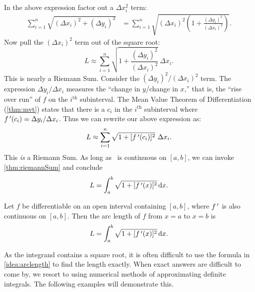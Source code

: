 In the above expression factor out a $\Delta x_i^2$ term:
\begin{align*}
	\sum_{i=1}^n \sqrt{(\Delta x_i)^2 + (\Delta y_i)^2}
	&= \sum_{i=1}^n \sqrt{(\Delta x_i)^2\left(1 + \frac{(\Delta y_i)^2}{(\Delta x_i)^2}\right)}.
\end{align*}
Now pull the $(\Delta x_i)^2$ term out of the square root:
\[L\approx\sum_{i=1}^n\sqrt{1 + \frac{(\Delta y_i)^2}{(\Delta x_i)^2}}\ \Delta x_i.\]
This is nearly a Riemann Sum. Consider the $(\Delta y_i)^2/(\Delta x_i)^2$ term. The expression $\Delta y_i/\Delta x_i$ measures the ``change in $y$/change in $x$,'' that is, the ``rise over run'' of $f$ on the $i^{\text{th}}$ subinterval. The Mean Value Theorem of Differentiation (\autoref{thm:mvt}) states that there is a $c_i$ in the $i^{\text{th}}$ subinterval where $f\,'(c_i) = \Delta y_i/\Delta x_i$. Thus we can rewrite our above expression as:
\[L\approx\sum_{i=1}^n\sqrt{1+[\fp(c_i)]^2}\ \Delta x_i.\]
This \emph{is} a Riemann Sum. As long as \fp\ is continuous on $[a,b]$, we can invoke \autoref{thm:riemannSum} and conclude
\[L=\int_a^b\sqrt{1+[f\,'(x)]^2}\operatorname{d}\! x.\]

\begin{keyidea}\label{idea:arclength}%
Let $f$ be differentiable on an open interval containing $[a,b]$, where $f\,'$ is also continuous on $[a,b]$. Then the arc length of $f$ from $x=a$ to $x=b$ is
\[L = \int_a^b \sqrt{1+[f\,'(x)]^2}\operatorname{d}\! x.\]
\end{keyidea}


As the integrand contains a square root, it is often difficult to use the formula in \autoref{idea:arclength} to find the length exactly. When exact answers are difficult to come by, we resort to using numerical methods of approximating definite integrals. The following examples will demonstrate this.

